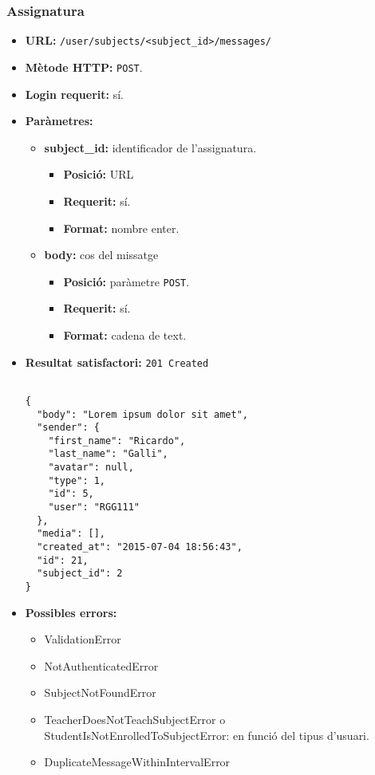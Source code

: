 	\subsubsection{Assignatura}
	\begin{itemize}
\item \textbf{\ac{URL}:} \texttt{/user/subjects/<subject\_id>/messages/}
\item \textbf{Mètode \ac{HTTP}: } \texttt{POST}.
\item \textbf{Login requerit:} sí.
\item \textbf{Paràmetres:}
	\begin{itemize}
		\item \textbf{subject\_id:} identificador de l'assignatura.
		\begin{itemize}
			\item \textbf{Posició:} \ac{URL}
			\item \textbf{Requerit:} sí.
			\item \textbf{Format:} nombre enter.
		\end{itemize}
		\item \textbf{body:} cos del missatge
		\begin{itemize}
			\item \textbf{Posició:} paràmetre \texttt{POST}.
			\item \textbf{Requerit:} sí.
			\item \textbf{Format:} cadena de text.
		\end{itemize}
	\end{itemize}
\item \textbf{Resultat satisfactori:} \texttt{201 Created}
	\begin{verbatim}
	
{
  "body": "Lorem ipsum dolor sit amet",
  "sender": {
    "first_name": "Ricardo",
    "last_name": "Galli",
    "avatar": null,
    "type": 1,
    "id": 5,
    "user": "RGG111"
  },
  "media": [],
  "created_at": "2015-07-04 18:56:43",
  "id": 21,
  "subject_id": 2
}
	\end{verbatim}
\item \textbf{Possibles errors:}
	\begin{itemize}
		\item ValidationError
		\item NotAuthenticatedError
		\item SubjectNotFoundError
		\item TeacherDoesNotTeachSubjectError o StudentIsNotEnrolledToSubjectError: en funció del tipus d'usuari.
		\item DuplicateMessageWithinIntervalError
	\end{itemize}
	\end{itemize}
	

